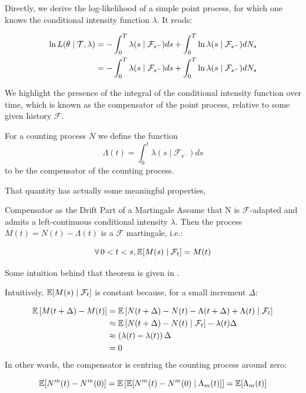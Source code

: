 Directly, we derive the log-likelihood of a simple point process, for which one knows the conditional intensity function $\lambda$. It reads:

\begin{align}
\ln L( \theta \mid \mathcal{T}, \lambda ) &= - \int_0^T  \lambda(s \mid \mathcal F_{s^-}) ds + \int_0^T  \ln \lambda(s \mid \mathcal F_{s^-} )d N_s \notag \\
&=  - \int_0^T \lambda(s \mid \mathcal F_{s^-}) ds + \int_0^T  \ln \lambda(s \mid \mathcal F_{s^-} )d N_s 
\label{eq:intensity_lambda}
\end{align}

We highlight the presence of the integral of the conditional intensity function over time, which is known as the compensator of the point process, relative to some given history $\mathcal F$. 


\begin{definition}[Compensator]
\label{def:compensator}
For a counting process $N$ we define the function $$\Lambda(t) = \int_0^t \lambda (s \mid \mathcal F_{s^-} ) ds $$  to be the compensator of the counting process.
\end{definition}

That quantity has actually some meaningful properties,

\begin{theoreme}{Compensator as the Drift Part of a Martingale}
Assume that N is $\mathcal F$-adapted and admits a left-continuous conditional intensity $\lambda$. Then the process $M(t) = N(t) - \Lambda (t)$ is a $\mathcal F$ martingale, i.e.:

$$\forall 0 < t < s, \E [ M(s) \mid \mathcal F_t ] = M(t)$$
\end{theoreme}


\begin{demo}{}{}
Some intuition behind that theorem is given in \cite{daley}.

Intuitively, $\mathbb E[M(s) \mid \mathcal F_t]$ is constant because, for a small increment $\Delta$:

\begin{align*}
\mathbb E \left [ M( t + \Delta ) - M(t) \right ] &= \mathbb E \left[ N(t+ \Delta ) - N(t) - \Lambda( t + \Delta) + \Lambda(t) \mid \mathcal F_t \right ] \\
&\approx   \mathbb E \left[ N(t+ \Delta ) - N(t) \mid \mathcal F_t \right ] - \lambda(t) \Delta  \\
&\approx \left ( \lambda(t) - \lambda(t) \right  ) \Delta  \\
&= 0 
\end{align*}
In other words, the compensator is centring the counting process around zero: 

$$\mathbb E [ N^m (t) - N^m (0) ] = \mathbb E  \left  [ \mathbb E [ N^m (t) - N^m (0) \mid \Lambda_m(t) ]  \right ] = \mathbb E [ \Lambda_m (t) ] $$

\end{demo}

